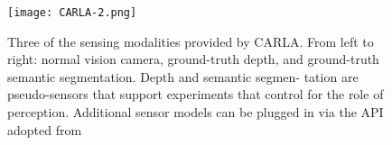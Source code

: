 \documentclass[letterpaper,titlepage]{article}
\begin{document}
\begin{figure}[H]
\centering
\texttt{[image: CARLA-2.png]}
\caption{Three of the sensing modalities provided by CARLA. From left to right: normal vision camera, ground-truth depth, and ground-truth semantic segmentation. Depth and semantic segmen- tation are pseudo-sensors that support experiments that control for the role of perception. Additional sensor models can be plugged in via the API adopted from \citep{CARLA:2017}}
\label{g:CARLA-2}
\end{figure}

\newpage


\end{document}
